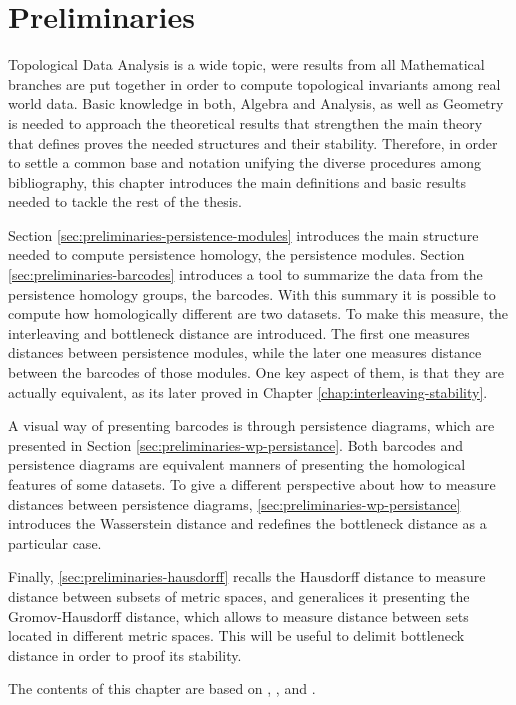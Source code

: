 \chapter{Preliminaries}

Topological Data Analysis is a wide topic, were results from all Mathematical branches are put together in order to compute topological invariants among real world data. Basic knowledge in both, Algebra and Analysis, as well as Geometry is needed to approach the theoretical results that strengthen the main theory that defines proves the needed structures and their stability. Therefore, in order to settle a common base and notation unifying the diverse procedures among bibliography, this chapter introduces the main definitions and basic results needed to tackle the rest of the thesis.

Section \ref{sec:preliminaries-persistence-modules} introduces the main structure needed to compute persistence homology, the persistence modules. Section \ref{sec:preliminaries-barcodes} introduces a tool to summarize the data from the persistence homology groups, the barcodes. With this summary it is possible to compute how homologically different are two datasets. To make this measure, the interleaving and bottleneck distance are introduced. The first one measures distances between persistence modules, while the later one measures distance between the barcodes of those modules. One key aspect of them, is that they are actually equivalent, as its later proved in Chapter \ref{chap:interleaving-stability}.

A visual way of presenting barcodes is through persistence diagrams, which are presented in Section \ref{sec:preliminaries-wp-persistance}. Both barcodes and persistence diagrams are equivalent manners of presenting the homological features of some datasets. To give a different perspective about how to measure distances between persistence diagrams, \ref{sec:preliminaries-wp-persistance} introduces the Wasserstein distance and redefines the bottleneck distance as a particular case.

Finally, \ref{sec:preliminaries-hausdorff} recalls the Hausdorff distance to measure distance between subsets of metric spaces, and generalices it presenting the Gromov-Hausdorff distance, which allows to measure distance between sets located in different metric spaces. This will be useful to delimit bottleneck distance in order to proof its stability.

The contents of this chapter are based on \cite{burago}, \cite{nanda}, \cite{polterovich} and \cite{wang}.


